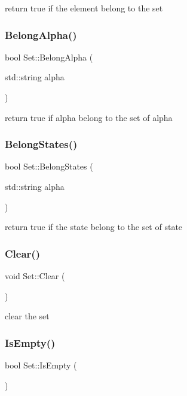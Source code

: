 return true if the element belong to the set \mbox{\label{classSet_a80ff19b9d44830084708478bac29231b}} 
\subsubsection{\texorpdfstring{Belong\+Alpha()}{BelongAlpha()}}
{\footnotesize\ttfamily bool Set\+::\+Belong\+Alpha (\begin{DoxyParamCaption}\item[{std\+::string}]{alpha }\end{DoxyParamCaption})}

return true if alpha belong to the set of alpha \mbox{\label{classSet_a8300b84ddc30a216c3e2d1b467e606bc}} 
\subsubsection{\texorpdfstring{Belong\+States()}{BelongStates()}}
{\footnotesize\ttfamily bool Set\+::\+Belong\+States (\begin{DoxyParamCaption}\item[{std\+::string}]{alpha }\end{DoxyParamCaption})}

return true if the state belong to the set of state \mbox{\label{classSet_abe5c5439f3665baba2da0b1f1a4c03fd}} 
\subsubsection{\texorpdfstring{Clear()}{Clear()}}
{\footnotesize\ttfamily void Set\+::\+Clear (\begin{DoxyParamCaption}{ }\end{DoxyParamCaption})}

clear the set \mbox{\label{classSet_a0361a3a2b7a408514a259b326245cbc7}} 
\subsubsection{\texorpdfstring{Is\+Empty()}{IsEmpty()}}
{\footnotesize\ttfamily bool Set\+::\+Is\+Empty (\begin{DoxyParamCaption}{ }\end{DoxyParamCaption})}

